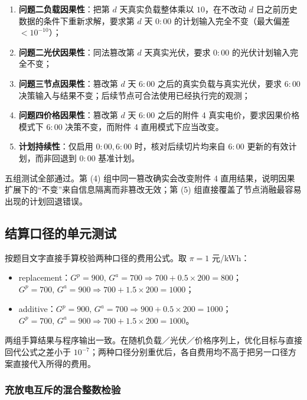 \begin{enumerate}[label=(\arabic*), itemsep=2pt, topsep=2pt]
	\item \textbf{问题二负载因果性}：把第 $d$ 天真实负载整体乘以 $10$，在不改动 $d$ 日之前历史数据的条件下重新求解，要求第 $d$ 天 $0{:}00$ 的计划输入完全不变（最大偏差 $<10^{-10}$）；
	\item \textbf{问题二光伏因果性}：同法篡改第 $d$ 天真实光伏，要求 $0{:}00$ 的光伏计划输入完全不变；
	\item \textbf{问题三节点因果性}：篡改第 $d$ 天 $6{:}00$ 之后的真实负载与真实光伏，要求 $6{:}00$ 决策输入与结果不变；后续节点可合法使用已经执行完的观测；
	\item \textbf{问题四价格因果性}：篡改第 $d$ 天 $6{:}00$ 之后的附件 4 真实电价，要求因果价格模式下 $6{:}00$ 决策不变，而附件 4 直用模式下应当改变。
	\item \textbf{计划持续性}：仅启用 $0{:}00,6{:}00$ 时，核对后续切片均来自 $6{:}00$ 更新的有效计划，而非回退到 $0{:}00$ 基准计划。
\end{enumerate}

五组测试全部通过。第 (4) 组中同一篡改确实会改变附件 4 直用结果，说明因果扩展下的“不变”来自信息隔离而非篡改无效；第 (5) 组直接覆盖了节点消融最容易出现的计划回退错误。

\subsection{结算口径的单元测试}

按题目文字直接手算校验两种口径的费用公式。取 $\pi=1$ 元/kWh：

\begin{itemize}[itemsep=1pt, topsep=2pt]
	\item replacement：$G^{p}=900,\,G^{a}=700\Rightarrow 700+0.5\times200=800$；$G^{p}=700,\,G^{a}=900\Rightarrow 700+1.5\times200=1000$；
	\item additive：$G^{p}=900,\,G^{a}=700\Rightarrow 900+0.5\times200=1000$；$G^{p}=700,\,G^{a}=900\Rightarrow 700+1.5\times200=1000$。
\end{itemize}

两组手算结果与程序输出一致。在随机负载／光伏／价格序列上，优化目标与直接回代公式之差小于 $10^{-7}$；两种口径分别重优后，各自费用均不高于把另一口径方案直接代入所得的费用。

\subsubsection{充放电互斥的混合整数检验}

